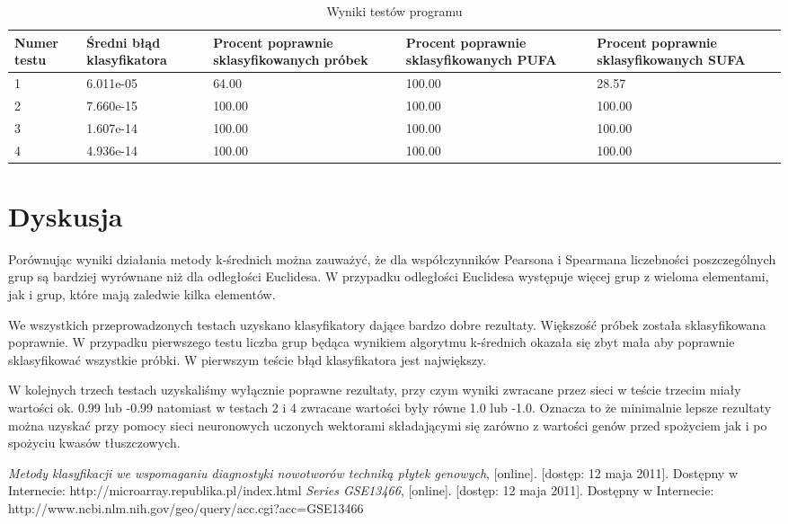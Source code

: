 \documentclass{classrep}
\begin{document}
\begin{table}
\caption{Wyniki testów programu}
\label{testTab1}
\begin{tabular}{|p{1.5cm}|p{2.5cm}|p{2.5cm}|p{2.5cm}|p{2.5cm}|}
 \textbf{Numer testu} & \textbf{Średni błąd klasyfikatora} & \textbf{Procent poprawnie sklasyfikowanych próbek} & \textbf{Procent poprawnie sklasyfikowanych PUFA} & \textbf{Procent poprawnie sklasyfikowanych SUFA} \\ \hline
 1 & 6.011e-05 & 64.00  & 100.00 & 28.57	\\ \hline
 2 & 7.660e-15 & 100.00 & 100.00 & 100.00	\\ \hline
 3 & 1.607e-14 & 100.00 & 100.00 & 100.00 	\\ \hline
 4 & 4.936e-14 & 100.00 & 100.00 & 100.00 	\\ \hline
\end{tabular}
\end{table}

\section{Dyskusja}
Porównując wyniki działania metody k-średnich można zauważyć, że dla współczynników Pearsona i Spearmana liczebności poszczególnych grup są bardziej wyrównane niż dla odległości Euclidesa. W przypadku odległości Euclidesa występuje więcej grup z wieloma elementami, jak i grup, które mają zaledwie kilka elementów.

We wszystkich przeprowadzonych testach uzyskano klasyfikatory dające bardzo dobre rezultaty. Większość próbek została sklasyfikowana poprawnie. W przypadku pierwszego testu liczba grup będąca wynikiem algorytmu k-średnich okazała się zbyt mała aby poprawnie sklasyfikować wszystkie próbki. W pierwszym teście błąd klasyfikatora jest największy.

W kolejnych trzech testach uzyskaliśmy wyłącznie poprawne rezultaty, przy czym wyniki zwracane przez sieci w teście trzecim miały wartości ok. 0.99 lub -0.99 natomiast w testach 2 i 4 zwracane wartości były równe 1.0 lub -1.0. Oznacza to że minimalnie lepsze rezultaty można uzyskać przy pomocy sieci neuronowych uczonych wektorami składającymi się zarówno z wartości genów przed spożyciem jak i po spożyciu kwasów tłuszczowych.

\begin{thebibliography}{0}
\textit{Metody klasyfikacji we wspomaganiu diagnostyki nowotworów techniką płytek genowych}, [online]. [dostęp: 12 maja
2011]. Dostępny w Internecie: http://microarray.republika.pl/index.html
\textit{Series GSE13466}, [online]. [dostęp: 12 maja 2011].
Dostępny w Internecie: http://www.ncbi.nlm.nih.gov/geo/query/acc.cgi?acc=GSE13466
\end{thebibliography}
\end{document}
